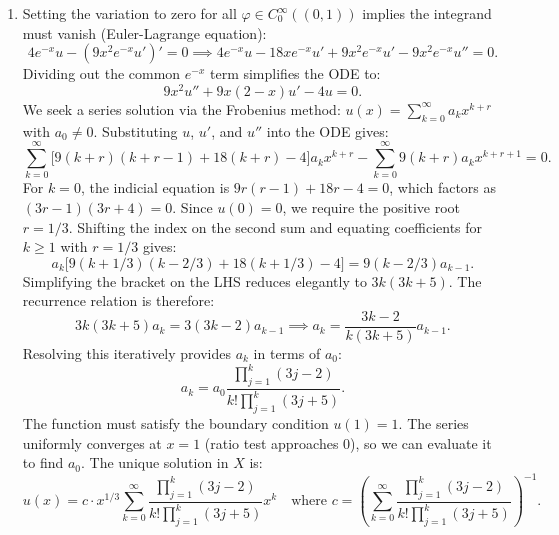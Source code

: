 \documentclass[10pt,a4paper]{article}
\begin{document}
\begin{enumerate}[label=\fbox{\arabic*}]
\begin{enumerate}[label=(\arabic*)]
          \item Setting the variation to zero for all $\varphi \in C_0^\infty((0, 1))$ implies the integrand must vanish (Euler-Lagrange equation):
          \[
            4e^{-x}u - (9x^2 e^{-x} u')' = 0 \implies 4e^{-x}u - 18x e^{-x}u' + 9x^2 e^{-x}u' - 9x^2 e^{-x} u'' = 0.
          \]
          Dividing out the common $e^{-x}$ term simplifies the ODE to:
          \[
            9x^2 u'' + 9x(2 - x) u' - 4u = 0.
          \]
          We seek a series solution via the Frobenius method: $u(x) = \sum_{k=0}^\infty a_k x^{k+r}$ with $a_0 \neq 0$.
          Substituting $u$, $u'$, and $u''$ into the ODE gives:
          \[
            \sum_{k=0}^\infty \big[ 9(k+r)(k+r-1) + 18(k+r) - 4 \big] a_k x^{k+r} - \sum_{k=0}^\infty 9(k+r) a_k x^{k+r+1} = 0.
          \]
          For $k=0$, the indicial equation is $9r(r-1) + 18r - 4 = 0$, which factors as $(3r-1)(3r+4) = 0$. Since $u(0) = 0$, we require the positive root $r = 1/3$.
          Shifting the index on the second sum and equating coefficients for $k \ge 1$ with $r=1/3$ gives:
          \[
            a_k \big[ 9(k+1/3)(k-2/3) + 18(k+1/3) - 4 \big] = 9(k-2/3) a_{k-1}.
          \]
          Simplifying the bracket on the LHS reduces elegantly to $3k(3k+5)$. The recurrence relation is therefore:
          \[
            3k(3k+5) a_k = 3(3k-2) a_{k-1} \implies a_k = \frac{3k-2}{k(3k+5)} a_{k-1}.
          \]
          Resolving this iteratively provides $a_k$ in terms of $a_0$:
          \[
            a_k = a_0 \frac{\prod_{j=1}^k (3j-2)}{k! \prod_{j=1}^k (3j+5)}.
          \]
          The function must satisfy the boundary condition $u(1) = 1$. The series uniformly converges at $x=1$ (ratio test approaches $0$), so we can evaluate it to find $a_0$.
          The unique solution in $X$ is:
          \[
            u(x) = c \cdot x^{1/3} \sum_{k=0}^\infty \frac{\prod_{j=1}^k (3j-2)}{k! \prod_{j=1}^k (3j+5)} x^k \quad \text{where } c = \left( \sum_{k=0}^\infty \frac{\prod_{j=1}^k (3j-2)}{k! \prod_{j=1}^k (3j+5)} \right)^{-1}.
          \]
        \end{enumerate}


\end{enumerate}
\end{document}
